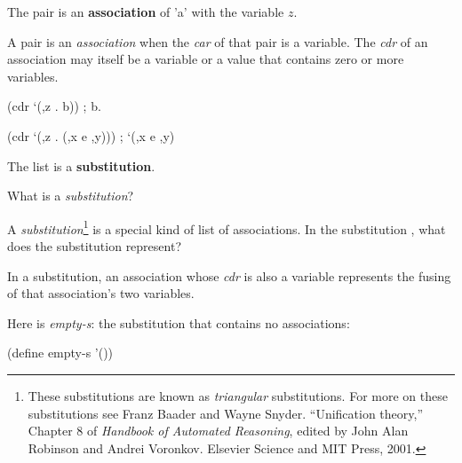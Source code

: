 \documentclass[letterpaper]{article}
\begin{document}
The pair  is an \textbf{association} of \scheme'a' with the variable
$z$.

A pair is an \textit{association} when the \textit{car} of that pair is a variable.
The \textit{cdr} of an association may itself be a variable or a value that contains
zero or more variables.

\begin{schemedisplay}
  (cdr `(,z . b))
  ; b.

  (cdr `(,z . (,x e ,y)))
  ; `(,x e ,y)
\end{schemedisplay}

The list  is a \textbf{substitution}.

What is a \textit{substitution}?

A \textit{substitution}\footnote{
  These substitutions are known as \textit{triangular} substitutions. For more on these
  substitutions see Franz Baader and Wayne Snyder. ``Unification theory,'' Chapter 8
  of \textit{Handbook of Automated Reasoning}, edited by John Alan Robinson and Andrei
  Voronkov. Elsevier Science and MIT Press, 2001.
} is a special kind of list of associations. In the substitution ,
what does the substitution  represent?

In a substitution, an association whose \textit{cdr} is also a variable represents the
fusing of that association's two variables.

Here is \textit{empty-s}: the substitution that contains no associations:

\begin{schemedisplay}
  (define empty-s '())
\end{schemedisplay}
  
\end{document}
